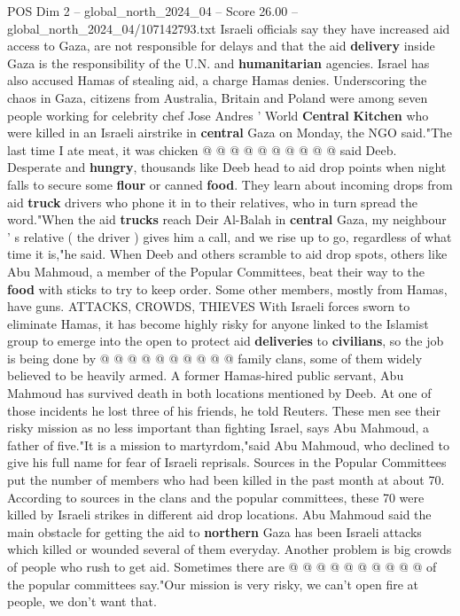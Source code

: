 \begin{textsample}{POS Dim 2 – global\_north\_2024\_04 – Score 26.00 – global\_north\_2024\_04/107142793.txt}
Israeli officials say they have increased aid access to Gaza, are not responsible for delays and that the aid \textbf{delivery} inside Gaza is the responsibility of the U.N. and \textbf{humanitarian} agencies.
Israel has also accused Hamas of stealing aid, a charge Hamas denies.
Underscoring the chaos in Gaza, citizens from Australia, Britain and Poland were among seven people working for celebrity chef Jose Andres ' World \textbf{Central} \textbf{Kitchen} who were killed in an Israeli airstrike in \textbf{central} Gaza on Monday, the NGO said."The last time I ate meat, it was chicken @ @ @ @ @ @ @ @ @ @ said Deeb.
Desperate and \textbf{hungry}, thousands like Deeb head to aid drop points when night falls to secure some \textbf{flour} or canned \textbf{food}.
They learn about incoming drops from aid \textbf{truck} drivers who phone it in to their relatives, who in turn spread the word."When the aid \textbf{trucks} reach Deir Al-Balah in \textbf{central} Gaza, my neighbour ' s relative ( the driver ) gives him a call, and we rise up to go, regardless of what time it is,"he said.
When Deeb and others scramble to aid drop spots, others like Abu Mahmoud, a member of the Popular Committees, beat their way to the \textbf{food} with sticks to try to keep order.
Some other members, mostly from Hamas, have guns.
ATTACKS, CROWDS, THIEVES With Israeli forces sworn to eliminate Hamas, it has become highly risky for anyone linked to the Islamist group to emerge into the open to protect aid \textbf{deliveries} to \textbf{civilians}, so the job is being done by @ @ @ @ @ @ @ @ @ @ family clans, some of them widely believed to be heavily armed.
A former Hamas-hired public servant, Abu Mahmoud has survived death in both locations mentioned by Deeb.
At one of those incidents he lost three of his friends, he told Reuters.
These men see their risky mission as no less important than fighting Israel, says Abu Mahmoud, a father of five."It is a mission to martyrdom,"said Abu Mahmoud, who declined to give his full name for fear of Israeli reprisals.
Sources in the Popular Committees put the number of members who had been killed in the past month at about 70.
According to sources in the clans and the popular committees, these 70 were killed by Israeli strikes in different aid drop locations.
Abu Mahmoud said the main obstacle for getting the aid to \textbf{northern} Gaza has been Israeli attacks which killed or wounded several of them everyday.
Another problem is big crowds of people who rush to get aid.
Sometimes there are @ @ @ @ @ @ @ @ @ @ of the popular committees say."Our mission is very risky, we can't open fire at people, we don't want that.

\end{textsample}
